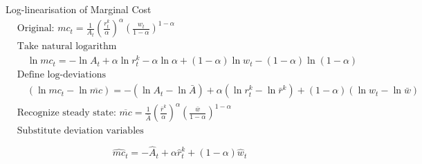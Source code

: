 \documentclass[11pt,preprint]{elsarticle}
\numberwithin{equation}{section}
\numberwithin{figure}{section}
\numberwithin{table}{section}
\begin{document}
Log-linearisation of Marginal Cost \begin{align*}
& \text{Original: } mc_t = \frac{1}{A_t} \left( \frac{r_t^k}{\alpha} \right)^{\alpha} \left( \frac{w_t}{1-\alpha} \right)^{1-\alpha} \\[6pt]
& \text{Take natural logarithm} \\
& \quad \ln mc_t = -\ln A_t + \alpha \ln r_t^k - \alpha \ln \alpha + (1-\alpha) \ln w_t - (1-\alpha) \ln (1-\alpha) \\[6pt]
& \text{Define log-deviations} \\
& \quad (\ln mc_t - \ln \overline{mc}) = -(\ln A_t - \ln \bar{A}) + \alpha (\ln r_t^k - \ln \bar{r}^k) + (1-\alpha) (\ln w_t - \ln \bar{w}) \\[6pt]
& \text{Recognize steady state: } \overline{mc} = \frac{1}{\bar{A}} \left( \frac{\bar{r}^k}{\alpha} \right)^{\alpha} \left( \frac{\bar{w}}{1-\alpha} \right)^{1-\alpha} \\[6pt]
& \text{Substitute deviation variables}
\end{align*}

\begin{equation}\label{marginal_cost_linearised_app}
\boxed{\widehat{mc}_t = -\hat{A}_t + \alpha \hat{r}^k_t + (1-\alpha) \hat{w}_t}
\end{equation}
\end{document}
